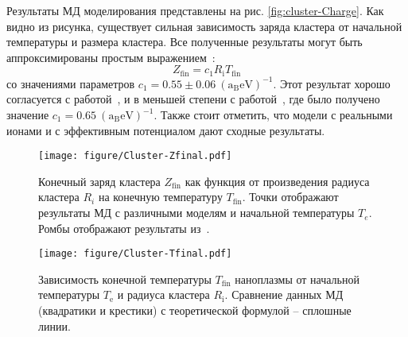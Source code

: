 Результаты МД моделирования представлены на рис. \ref{fig:cluster-Charge}. Как видно из рисунка, существует сильная зависимость заряда кластера от начальной температуры и размера кластера. Все полученные результаты могут быть аппроксимированы простым выражением~\cite{Broda_CPP13}:
\begin{equation}\label{eq:final_charge}
Z_\mathrm{fin} = c_1 R_\mathrm{i} T_\mathrm{fin}
\end{equation}
со значениями параметров $c_1=0.55 \pm 0.06~\mathrm{(a_B eV)}^{-1}$. Этот результат хорошо согласуется с работой~\cite{MB-PRB15}, и в меньшей степени с работой~\cite{Broda_CPP13}, где было получено значение  $c_1=0.65~\mathrm{(a_B eV)}^{-1}$. Также стоит отметить, что модели с реальными ионами и с эффективным потенциалом дают сходные результаты. 
\begin{figure}[t]
	\begin{multicols}{2}
		\centering
		
		\texttt{[image: figure/Cluster-Zfinal.pdf]}
		\caption{\label{fig:cluster-Charge}Конечный заряд кластера $Z_\text{fin}$ как функция от произведения  радиуса кластера $R_i$ на конечную температуру $T_\text{fin}$.
		Точки отображают результаты МД с различными моделям и начальной температуры $T_e$. Ромбы отображают результаты из~\protect\cite{Broda_CPP13}. 	
	}
	
		\centering
		
		\texttt{[image: figure/Cluster-Tfinal.pdf]}
		\caption{\label{fig:cluster-Temperature}Зависимость конечной температуры $T_\mathrm{fin}$ наноплазмы от начальной 
			температуры $T_\text{e}$ и радиуса кластера $R_\mathrm{i}$. Сравнение данных МД (квадратики и			
			крестики) с теоретической формулой – сплошные линии.}
	\end{multicols}
\end{figure}

